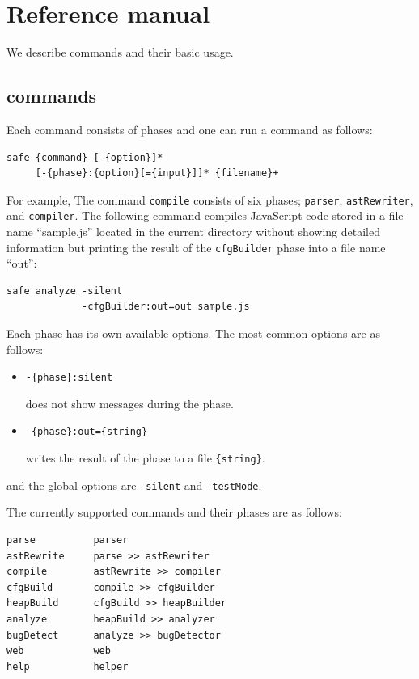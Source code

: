 \chapter{Reference manual}
\label{c:3:refman}

We describe \safe commands and their basic usage.

\section{\safe commands}
Each command consists of phases and one can run a \safe command as follows:
\begin{verbatim}
safe {command} [-{option}]*
     [-{phase}:{option}[={input}]]* {filename}+
\end{verbatim}
For example, The command \verb!compile! consists of six phases; 
\verb!parser!, \verb!astRewriter!, and \verb!compiler!.
The following command compiles JavaScript code stored in a file name
``{sample.js}'' located in the current directory without showing detailed
information but printing the result of the \verb!cfgBuilder!
phase into a file name ``{out}'':
\begin{verbatim}
safe analyze -silent
             -cfgBuilder:out=out sample.js
\end{verbatim}

Each phase has its own available options.
The most common options are as follows:
\begin{itemize}
\item \verb!-{phase}:silent!

\safe does not show messages during the phase.

\item \verb!-{phase}:out={string}!

\safe writes the result of the phase to a file \verb!{string}!.
\end{itemize}
and the global options are \verb!-silent! and \verb!-testMode!.

The currently supported commands and their phases are as follows:
\begin{verbatim}
parse          parser
astRewrite     parse >> astRewriter
compile        astRewrite >> compiler
cfgBuild       compile >> cfgBuilder
heapBuild      cfgBuild >> heapBuilder
analyze        heapBuild >> analyzer
bugDetect      analyze >> bugDetector
web            web
help           helper
\end{verbatim}

